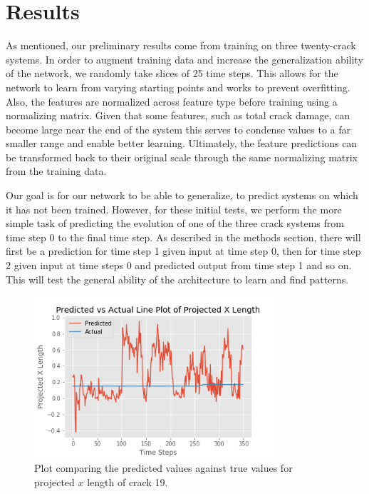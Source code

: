 \section{Results}

As mentioned, our preliminary results come from training on three twenty-crack systems. In order to augment training data and increase the generalization ability of the network, we randomly take slices of 25 time steps. This allows for the network to learn from varying starting points and works to prevent overfitting. Also, the features are normalized across feature type before training using a normalizing matrix. Given that some features, such as total crack damage, can become large near the end of the system this serves to condense values to a far smaller range and enable better learning. Ultimately, the feature predictions can be transformed back to their original scale through the same normalizing matrix from the training data.

Our goal is for our network to be able to generalize, to predict systems on which it has not been trained. However, for these initial tests, we perform the more simple task of predicting the evolution of one of the three crack systems from time step 0 to the final time step. As described in the methods section, there will first be a prediction for time step 1 given input at time step 0, then for time step 2 given input at time steps 0 and predicted output from time step 1 and so on. This will test the general ability of the architecture to learn and find patterns.

\begin{figure}[!htb]
\centering
\includegraphics[width=0.8\textwidth]{images/Projected_X_Length_compare_transformed}
\caption{Plot comparing the predicted values against true values for projected $x$ length of crack 19.}
\label{fig:proj_y}
\end{figure}

